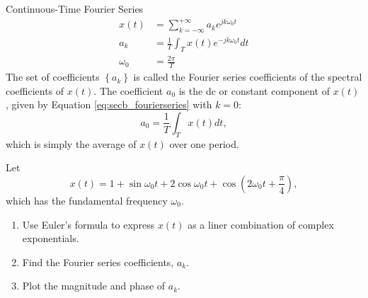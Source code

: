 \begin{frame}{Continuous-Time Fourier Series}
    \begin{equation}\label{eq:secb_fourierseries}
        \begin{aligned}
            x(t) &= \sum_{k=-\infty}^{+\infty}a_k e^{jk\omega_0 t}\\
            a_k &= \frac{1}{T} \int_{T}x(t)e^{-jk\omega_0 t}dt\\
            \omega_0 &= \frac{2\pi}{T}
        \end{aligned}
    \end{equation}
    The set of coefficients $\left\{a_k\right\}$ is called the \alert{Fourier series coefficients} of the \alert{spectral coefficients} of $x(t)$.
    The coefficient $a_0$ is the dc or constant component of $x(t)$, given by Equation \ref{eq:secb_fourierseries} with $k=0$:
    \begin{equation}\label{eq:secb_a0}
        a_0 = \frac{1}{T} \int_{T}x(t)dt,
    \end{equation}
    which is simply the average of $x(t)$ over one period.
\end{frame}

\begin{frame}
    \begin{example}
        Let
        \begin{equation*}
            x(t) = 1 + \sin \omega_0t + 2\cos\omega_0t+ \cos\left(2\omega_0t+ \frac{\pi}{4}\right),
        \end{equation*}
        which has the fundamental frequency $\omega_0$.
        \begin{enumerate}
            \item Use Euler's formula to express $x(t)$ as a liner combination of complex exponentials.
            \item Find the Fourier series coefficients, $a_k$.
            \item Plot the magnitude and phase of $a_k$.
        \end{enumerate}

    \end{example}
\end{frame}

